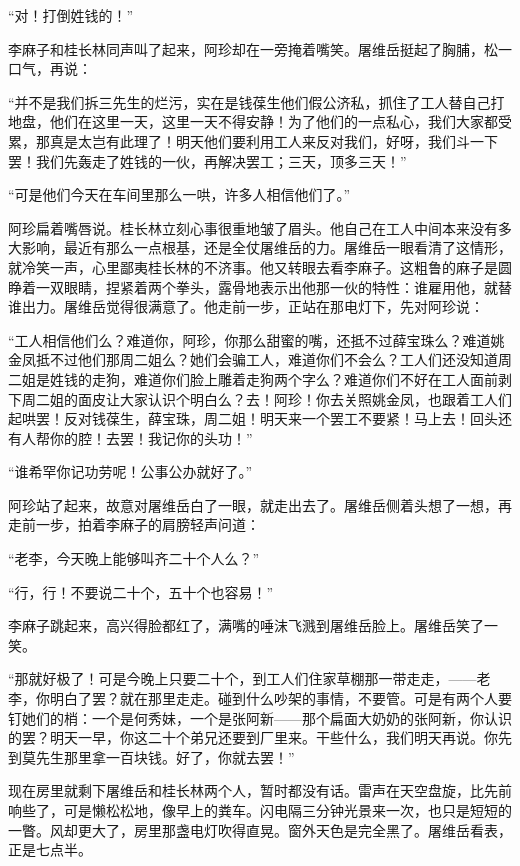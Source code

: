 \par “对！打倒姓钱的！”
\par 李麻子和桂长林同声叫了起来，阿珍却在一旁掩着嘴笑。屠维岳挺起了胸脯，松一口气，再说：
\par “并不是我们拆三先生的烂污，实在是钱葆生他们假公济私，抓住了工人替自己打地盘，他们在这里一天，这里一天不得安静！为了他们的一点私心，我们大家都受累，那真是太岂有此理了！明天他们要利用工人来反对我们，好呀，我们斗一下罢！我们先轰走了姓钱的一伙，再解决罢工；三天，顶多三天！”
\par “可是他们今天在车间里那么一哄，许多人相信他们了。”
\par 阿珍扁着嘴唇说。桂长林立刻心事很重地皱了眉头。他自己在工人中间本来没有多大影响，最近有那么一点根基，还是全仗屠维岳的力。屠维岳一眼看清了这情形，就冷笑一声，心里鄙夷桂长林的不济事。他又转眼去看李麻子。这粗鲁的麻子是圆睁着一双眼睛，捏紧着两个拳头，露骨地表示出他那一伙的特性：谁雇用他，就替谁出力。屠维岳觉得很满意了。他走前一步，正站在那电灯下，先对阿珍说：
\par “工人相信他们么？难道你，阿珍，你那么甜蜜的嘴，还抵不过薛宝珠么？难道姚金凤抵不过他们那周二姐么？她们会骗工人，难道你们不会么？工人们还没知道周二姐是姓钱的走狗，难道你们脸上雕着走狗两个字么？难道你们不好在工人面前剥下周二姐的面皮让大家认识个明白么？去！阿珍！你去关照姚金凤，也跟着工人们起哄罢！反对钱葆生，薛宝珠，周二姐！明天来一个罢工不要紧！马上去！回头还有人帮你的腔！去罢！我记你的头功！”
\par “谁希罕你记功劳呢！公事公办就好了。”
\par 阿珍站了起来，故意对屠维岳白了一眼，就走出去了。屠维岳侧着头想了一想，再走前一步，拍着李麻子的肩膀轻声问道：
\par “老李，今天晚上能够叫齐二十个人么？”
\par “行，行！不要说二十个，五十个也容易！”
\par 李麻子跳起来，高兴得脸都红了，满嘴的唾沫飞溅到屠维岳脸上。屠维岳笑了一笑。
\par “那就好极了！可是今晚上只要二十个，到工人们住家草棚那一带走走，——老李，你明白了罢？就在那里走走。碰到什么吵架的事情，不要管。可是有两个人要钉她们的梢：一个是何秀妹，一个是张阿新——那个扁面大奶奶的张阿新，你认识的罢？明天一早，你这二十个弟兄还要到厂里来。干些什么，我们明天再说。你先到莫先生那里拿一百块钱。好了，你就去罢！”
\par 现在房里就剩下屠维岳和桂长林两个人，暂时都没有话。雷声在天空盘旋，比先前响些了，可是懒松松地，像早上的粪车。闪电隔三分钟光景来一次，也只是短短的一瞥。风却更大了，房里那盏电灯吹得直晃。窗外天色是完全黑了。屠维岳看表，正是七点半。
